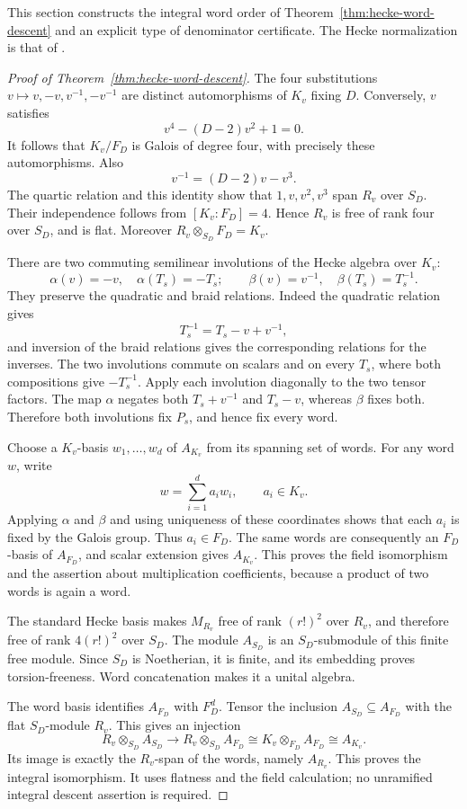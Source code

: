 This section constructs the integral word order of Theorem~\ref{thm:hecke-word-descent} and an explicit type of denominator certificate. The Hecke normalization is that of \citet[Section 3.1, pp.~20--21]{BSM2013}.

\begin{proof}[Proof of Theorem~\ref{thm:hecke-word-descent}]
The four substitutions $v\mapsto v,-v,v^{-1},-v^{-1}$ are distinct automorphisms of $K_v$ fixing $D$. Conversely, $v$ satisfies
\[
 v^4-(D-2)v^2+1=0.
\]
It follows that $K_v/F_D$ is Galois of degree four, with precisely these automorphisms. Also
\[
 v^{-1}=(D-2)v-v^3.
\]
The quartic relation and this identity show that $1,v,v^2,v^3$ span $R_v$ over $S_D$. Their independence follows from $[K_v:F_D]=4$. Hence $R_v$ is free of rank four over $S_D$, and is flat. Moreover $R_v\otimes_{S_D}F_D=K_v$.

There are two commuting semilinear involutions of the Hecke algebra over $K_v$:
\[
 \alpha(v)=-v,\quad \alpha(T_s)=-T_s;
 \qquad
 \beta(v)=v^{-1},\quad \beta(T_s)=T_s^{-1}.
\]
They preserve the quadratic and braid relations. Indeed the quadratic relation gives
\[
 T_s^{-1}=T_s-v+v^{-1},
\]
and inversion of the braid relations gives the corresponding relations for the inverses. The two involutions commute on scalars and on every $T_s$, where both compositions give $-T_s^{-1}$. Apply each involution diagonally to the two tensor factors. The map $\alpha$ negates both $T_s+v^{-1}$ and $T_s-v$, whereas $\beta$ fixes both. Therefore both involutions fix $P_s$, and hence fix every word.

Choose a $K_v$-basis $w_1,\ldots,w_d$ of $A_{K_v}$ from its spanning set of words. For any word $w$, write
\[
 w=\sum_{i=1}^d a_iw_i,\qquad a_i\in K_v.
\]
Applying $\alpha$ and $\beta$ and using uniqueness of these coordinates shows that each $a_i$ is fixed by the Galois group. Thus $a_i\in F_D$. The same words are consequently an $F_D$-basis of $A_{F_D}$, and scalar extension gives $A_{K_v}$. This proves the field isomorphism and the assertion about multiplication coefficients, because a product of two words is again a word.

The standard Hecke basis makes $M_{R_v}$ free of rank $(r!)^2$ over $R_v$, and therefore free of rank $4(r!)^2$ over $S_D$. The module $A_{S_D}$ is an $S_D$-submodule of this finite free module. Since $S_D$ is Noetherian, it is finite, and its embedding proves torsion-freeness. Word concatenation makes it a unital algebra.

The word basis identifies $A_{F_D}$ with $F_D^d$. Tensor the inclusion $A_{S_D}\subseteq A_{F_D}$ with the flat $S_D$-module $R_v$. This gives an injection
\[
 R_v\otimes_{S_D}A_{S_D}
 \longrightarrow R_v\otimes_{S_D}A_{F_D}
 \cong K_v\otimes_{F_D}A_{F_D}
 \cong A_{K_v}.
\]
Its image is exactly the $R_v$-span of the words, namely $A_{R_v}$. This proves the integral isomorphism. It uses flatness and the field calculation; no unramified integral descent assertion is required.


\end{proof}
